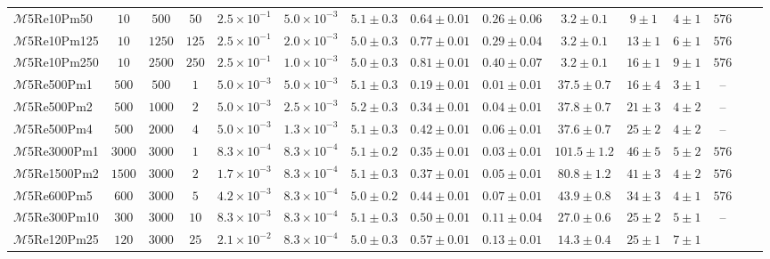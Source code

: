 \documentclass[12pt,twoside]{extreport}
\newcommand{\mSonicMach}{\ensuremath{\mathcal{M}}} %
\begin{document}
\begin{table}
{{\begin{threeparttable}
\begin{tabular}{l c c c c c c c c c c c c c c}
$\mSonicMach$5Re10Pm50
	& $10$ & $500$ & $50$
	& $2.5 \times 10^{-1}$ & $5.0 \times 10^{-3}$ & $5.1 \pm 0.3$
	& $0.64 \pm 0.01$ & $0.26 \pm 0.06$
	& $3.2 \pm 0.1$ & $9 \pm 1$ & $4 \pm 1$
	& $576$ \\
$\mSonicMach$5Re10Pm125
	& $10$ & $1250$ & $125$
	& $2.5 \times 10^{-1}$ & $2.0 \times 10^{-3}$ & $5.0 \pm 0.3$
	& $0.77 \pm 0.01$ & $0.29 \pm 0.04$
	& $3.2 \pm 0.1$ & $13 \pm 1$ & $6 \pm 1$
	& $576$ \\
$\mSonicMach$5Re10Pm250
	& $10$ & $2500$ & $250$
	& $2.5 \times 10^{-1}$ & $1.0 \times 10^{-3}$ & $5.0 \pm 0.3$
	& $0.81 \pm 0.01$ & $0.40 \pm 0.07$
	& $3.2 \pm 0.1$ & $16 \pm 1$ & $9 \pm 1$
	& $576$ \\
$\mSonicMach$5Re500Pm1
	& $500$ & $500$ & $1$
	& $5.0 \times 10^{-3}$ & $5.0 \times 10^{-3}$ & $5.1 \pm 0.3$
	& $0.19 \pm 0.01$ & $0.01 \pm 0.01$
	& $37.5 \pm 0.7$ & $16 \pm 4$ & $3 \pm 1$
	& -- \\
$\mSonicMach$5Re500Pm2
	& $500$ & $1000$ & $2$
	& $5.0 \times 10^{-3}$ & $2.5 \times 10^{-3}$ & $5.2 \pm 0.3$
	& $0.34 \pm 0.01$ & $0.04 \pm 0.01$
	& $37.8 \pm 0.7$ & $21 \pm 3$ & $4 \pm 2$
	& -- \\
$\mSonicMach$5Re500Pm4
	& $500$ & $2000$ & $4$
	& $5.0 \times 10^{-3}$ & $1.3 \times 10^{-3}$ & $5.1 \pm 0.3$
	& $0.42 \pm 0.01$ & $0.06 \pm 0.01$
	& $37.6 \pm 0.7$ & $25 \pm 2$ & $4 \pm 2$
	& -- \\
$\mSonicMach$5Re3000Pm1
	& $3000$ & $3000$ & $1$
	& $8.3 \times 10^{-4}$ & $8.3 \times 10^{-4}$ & $5.1 \pm 0.2$
	& $0.35 \pm 0.01$ & $0.03 \pm 0.01$
	& $101.5 \pm 1.2$ & $46 \pm 5$ & $5 \pm 2$
	& $576$ \\
$\mSonicMach$5Re1500Pm2
	& $1500$ & $3000$ & $2$
	& $1.7 \times 10^{-3}$ & $8.3 \times 10^{-4}$ & $5.1 \pm 0.3$
	& $0.37 \pm 0.01$ & $0.05 \pm 0.01$
	& $80.8 \pm 1.2$ & $41 \pm 3$ & $4 \pm 2$
	& $576$ \\
$\mSonicMach$5Re600Pm5
	& $600$ & $3000$ & $5$
	& $4.2 \times 10^{-3}$ & $8.3 \times 10^{-4}$ & $5.0 \pm 0.2$
	& $0.44 \pm 0.01$ & $0.07 \pm 0.01$
	& $43.9 \pm 0.8$ & $34 \pm 3$ & $4 \pm 1$
	& $576$ \\
$\mSonicMach$5Re300Pm10
	& $300$ & $3000$ & $10$
	& $8.3 \times 10^{-3}$ & $8.3 \times 10^{-4}$ & $5.1 \pm 0.3$
	& $0.50 \pm 0.01$ & $0.11 \pm 0.04$
	& $27.0 \pm 0.6$ & $25 \pm 2$ & $5 \pm 1$
	& -- \\
$\mSonicMach$5Re120Pm25
	& $120$ & $3000$ & $25$
	& $2.1 \times 10^{-2}$ & $8.3 \times 10^{-4}$ & $5.0 \pm 0.3$
	& $0.57 \pm 0.01$ & $0.13 \pm 0.01$
	& $14.3 \pm 0.4$ & $25 \pm 1$ & $7 \pm 1$

\end{tabular}
\end{threeparttable}}}
\end{table}
\end{document}
